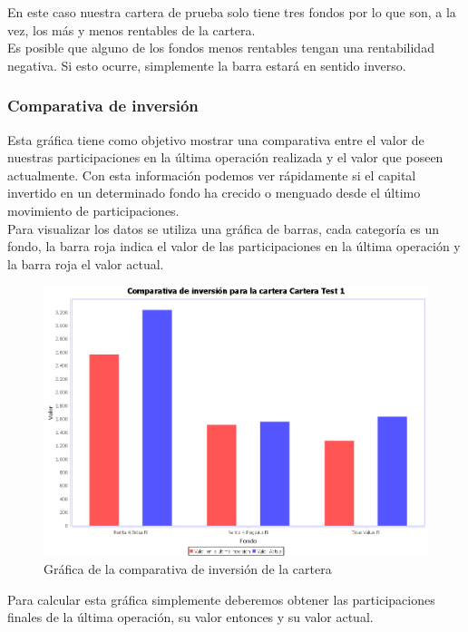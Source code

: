 \documentclass[12pt, a4paper]{book}
\begin{document}
En este caso nuestra cartera de prueba solo tiene tres fondos por lo que son, a la vez, los más y menos rentables de la cartera.\\

Es posible que alguno de los fondos menos rentables tengan una rentabilidad negativa. Si esto ocurre, simplemente la barra estará en sentido inverso.
	
\newpage
\subsubsection{Comparativa de inversión}

Esta gráfica tiene como objetivo mostrar una comparativa entre el valor de nuestras participaciones en la última operación realizada y el valor que poseen actualmente. Con esta información podemos ver rápidamente si el capital invertido en un determinado fondo ha crecido o menguado desde el último movimiento de participaciones.\\

Para visualizar los datos se utiliza una gráfica de barras, cada categoría es un fondo, la barra roja indica el valor de las participaciones en la última operación y la barra roja el valor actual.

	\begin{figure}[htbp]
	\centering
	\includegraphics[width=\textwidth]{figuras/comparativa.PNG}
	\caption{Gráfica de la comparativa de inversión de la cartera}
	\label{fig:comparativa}
	\end {figure}

Para calcular esta gráfica simplemente deberemos obtener las participaciones finales de la última operación, su valor entonces y su valor actual.\\ 
\end{document}
